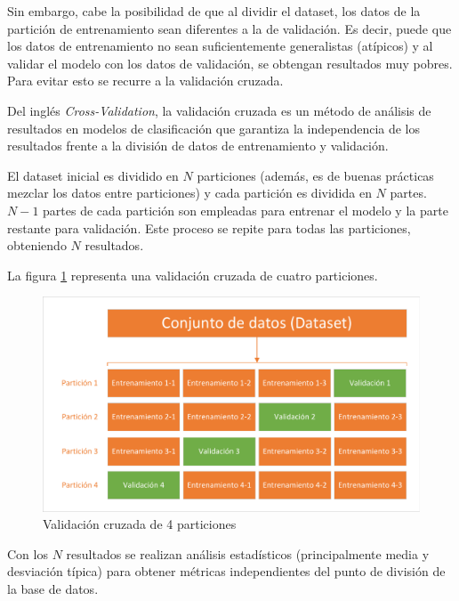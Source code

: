 Sin embargo, cabe la posibilidad de que al dividir el dataset, los datos de la partición de entrenamiento sean diferentes a la de validación. Es decir, puede que los datos de entrenamiento no sean suficientemente generalistas (atípicos) y al validar el modelo con los datos de validación, se obtengan resultados muy pobres. Para evitar esto se recurre a la validación cruzada.

Del inglés \textit{Cross-Validation}, la validación cruzada es un método de análisis de resultados en modelos de clasificación que garantiza la independencia de los resultados frente a la división de datos de entrenamiento y validación.

El dataset inicial es dividido en $N$ particiones (además, es de buenas prácticas mezclar los datos entre particiones) y cada partición es dividida en $N$ partes. $N-1$ partes de cada partición son empleadas para entrenar el modelo y la parte restante para validación. Este proceso se repite para todas las particiones, obteniendo $N$ resultados.

La figura \ref{fig:CV_cv4} representa una validación cruzada de cuatro particiones.

\begin{figure}[h]
	\centering
	\captionsetup{justification=centering}
	\includegraphics[width=\textwidth]{imagenes/marco_teorico/CV/cv_4.pdf}
	\caption{Validación cruzada de 4 particiones}
	\label{fig:CV_cv4}
\end{figure}

Con los $N$ resultados se realizan análisis estadísticos (principalmente media y desviación típica) para obtener métricas independientes del punto de división de la base de datos.

